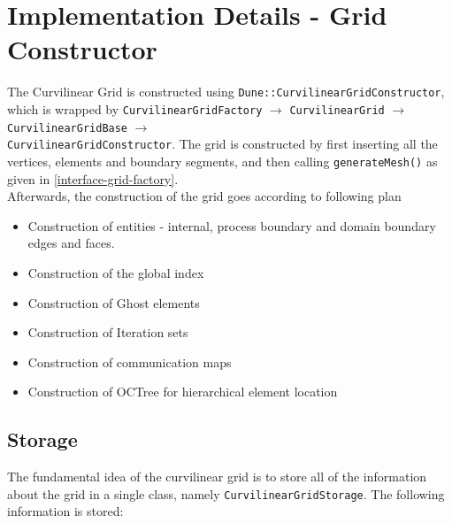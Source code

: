 \section{Implementation Details - Grid Constructor}
\label{impl-grid-constructor}



The Curvilinear Grid is constructed using \lstinline|Dune::CurvilinearGridConstructor|, which is wrapped by
\lstinline|CurvilinearGridFactory| $\rightarrow$
\lstinline|CurvilinearGrid| $\rightarrow$
\lstinline|CurvilinearGridBase| $\rightarrow$ \\
\noindent
\lstinline|CurvilinearGridConstructor|. The grid is constructed by first inserting all the vertices, elements and boundary segments, and then calling \lstinline|generateMesh()| as given in \ref{interface-grid-factory}. \\

\noindent
Afterwards, the construction of the grid goes according to following plan
\begin{itemize}
	\item Construction of entities - internal, process boundary and domain boundary edges and faces.
	\item Construction of the global index
	\item Construction of Ghost elements
	\item Construction of Iteration sets
	\item Construction of communication maps
	\item Construction of OCTree for hierarchical element location	
\end{itemize}


\subsection{Storage}

\noindent
The fundamental idea of the curvilinear grid is to store all of the information about the grid in a single class, namely \lstinline|CurvilinearGridStorage|. The following information is stored:

